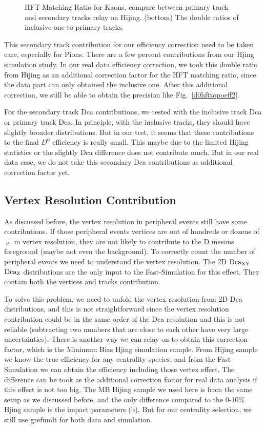 \begin{figure}[htbp]
\begin{minipage}[htbp]{0.47\linewidth}
\caption{ HFT Matching Ratio for Kaons, compare between primary track and secondary tracks relay on Hijing.  (bottom) The double ratios of inclusive one to primary tracks.\label{HijingKaonsRatio}}
\end{minipage}
\end{figure}

This secondary track contribution for our efficiency correction need to be taken care, especially for Pions. There are a few percent contributions from our Hjing simulation study. In our real data efficiency correction, we took this double ratio from Hijing as an additional correction factor for the HFT matching ratio, since the data part can only obtained the inclusive one. After this additional correction, we still be able to obtain the precision like Fig.~\ref{d0hfttopoeff2}.

For the secondary track Dca contributions, we tested with the inclusive track Dca or primary track Dca. In principle, with the inclusive tracks, they should have slightly broader distributions. But in our test, it seems that these contributions to the final $D^0$ efficiency is really small. This maybe due to the limited Hijing statistics or the slightly Dca difference does not contribute much. But in our real data case, we do not take this secondary Dca contributions as additional correction factor yet.


\subsection{Vertex Resolution Contribution}
\label{concern2}

As discussed before, the vertex resolution in peripheral events still have some contributions. If those peripheral events vertices are out of hundreds or dozens of $\upmu$ m vertex resolution, they are not likely to contribute to the D mesons foreground (maybe not even the background). To correctly count the number of peripheral events we need to understand the vertex resolution. The 2D $\textup{Dca}_{\textup{XY}}$ $\textup{Dca}_\textup{Z}$ distributions are the only input to the Fast-Simulation for this effect. They contain both the vertices and tracks contribution. 

To solve this problem, we need to unfold the vertex resolution from 2D Dca distributions, and this is not straightforward since the vertex resolution contribution could be in the same order of the Dca resolution and this is not reliable (subtracting two numbers that are close to each other have very large uncertainties). There is another way we can relay on to obtain this correction factor, which is the Minimum Bias Hjing simulation sample. From Hijing sample we know the true efficiency for any centrality species, and from the Fast-Simulation we can obtain the efficiency including those vertex effect. The difference can be took as the additional correction factor for real data analysis if this effect is not too big. The MB Hijing sample we used here is from the same setup as we discussed before, and the only difference compared to the 0-10\% Hjing sample is the impact parameters (b). But for our centrality selection, we still use grefumlt for both data and simulation.


